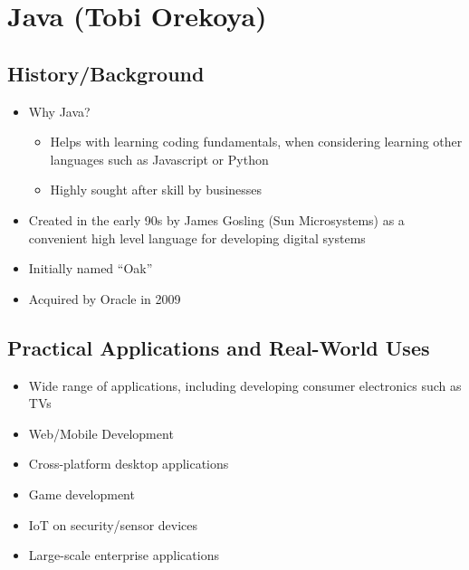 \section{Java (Tobi Orekoya)}

\subsection{History/Background}
\begin{itemize}
	\item Why Java?
	\begin{itemize}
		\item Helps with learning coding fundamentals, when considering learning other languages such as Javascript or Python
		\item Highly sought after skill by businesses
	\end{itemize}

	\item Created in the early 90s by James Gosling (Sun Microsystems) as a convenient high level language for developing digital systems
	 \item Initially named “Oak”
	\item Acquired by Oracle in 2009
	
\end{itemize}

\subsection{Practical Applications and Real-World Uses}
\begin{itemize}
	\item Wide range of applications, including developing consumer electronics such as TVs
	\item Web/Mobile Development
	\item Cross-platform desktop applications
	\item Game development
	\item IoT on security/sensor devices
	\item Large-scale enterprise applications
	
\end{itemize}

